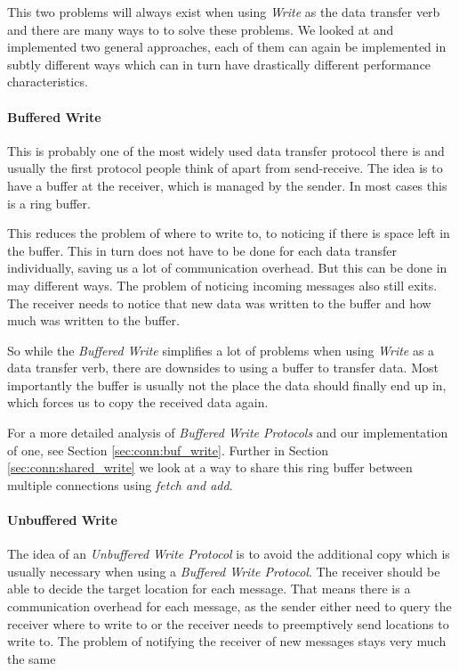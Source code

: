 This two problems will always exist when using \emph{Write} as the data transfer verb and there are many ways to to solve
these problems. We looked at and implemented two general approaches, each of them can again be implemented in subtly 
different ways which can in turn have drastically different performance characteristics.

\paragraph{Buffered Write}
This is probably one of the most widely used data transfer protocol there is and usually the first protocol people think of
apart from send-receive. The idea is to have a buffer at the receiver, which is managed by the sender. In most cases this is 
a ring buffer. 

This reduces the problem of where to write to, to noticing if there is space left in the buffer. This in turn does not 
have to be done for each data transfer individually, saving us a lot of communication overhead. But this can be done in 
may different ways. The problem of noticing incoming messages also still exits. The receiver needs to notice that new data was 
written to the buffer and how much was written to the buffer. 

So while the \emph{Buffered Write} simplifies a lot of problems when using \emph{Write} as a data transfer verb, there are 
downsides to using a buffer to transfer data. Most importantly the buffer is usually not the place the data should finally 
end up in, which forces us to copy the received data again.

For a more detailed analysis of \emph{Buffered Write Protocols} and our implementation of one, 
see Section \ref{sec:conn:buf_write}. Further in Section \ref{sec:conn:shared_write} we look at a way to share this ring
buffer between multiple connections using \emph{fetch and add}.


\paragraph{Unbuffered Write}
The idea of an \emph{Unbuffered Write Protocol} is to avoid the additional copy which is usually necessary when using a
\emph{Buffered Write Protocol}. The receiver should be able to decide the target location for each message. That means there
is a communication overhead for each message, as the sender either need to query the receiver where to write to or the receiver
needs to preemptively send locations to write to. The problem of notifying the receiver of new messages stays very much the same

